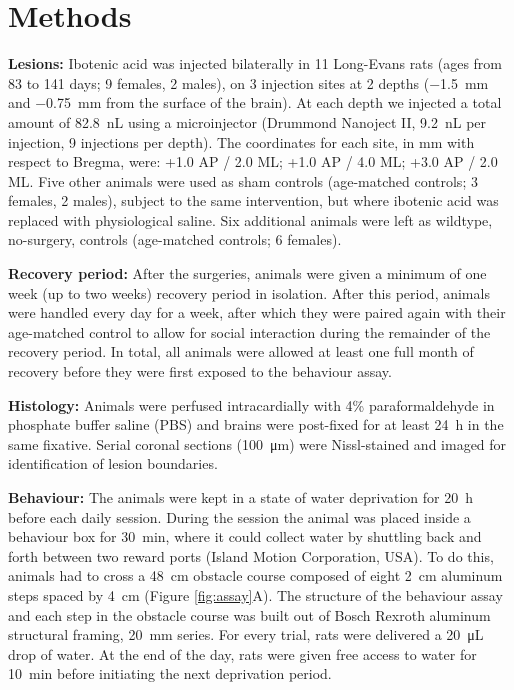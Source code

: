 \section{Methods}

\textbf{Lesions:} Ibotenic acid was injected bilaterally in 11 Long-Evans rats (ages from 83 to 141 days; 9 females, 2 males), on 3 injection sites at 2 depths (\SI{-1.5}{\milli\meter} and \SI{-0.75}{\milli\meter} from the surface of the brain). At each depth we injected a total amount of \SI{82.8}{\nano\liter} using a microinjector (Drummond Nanoject II, \SI{9.2}{\nano\liter} per injection, 9 injections per depth). The coordinates for each site, in \si{\milli\meter} with respect to Bregma, were: +1.0 AP / 2.0 ML; +1.0 AP / 4.0 ML; +3.0 AP / 2.0 ML. Five other animals were used as sham controls (age-matched controls; 3 females, 2 males), subject to the same intervention, but where ibotenic acid was replaced with physiological saline. Six additional animals were left as wildtype, no-surgery, controls (age-matched controls; 6 females).

\textbf{Recovery period:} After the surgeries, animals were given a minimum of one week (up to two weeks) recovery period in isolation. After this period, animals were handled every day for a week, after which they were paired again with their age-matched control to allow for social interaction during the remainder of the recovery period. In total, all animals were allowed at least one full month of recovery before they were first exposed to the behaviour assay.

\textbf{Histology:} Animals were perfused intracardially with 4\% paraformaldehyde in phosphate buffer saline (PBS) and brains were post-fixed for at least \SI{24}{\hour} in the same fixative. Serial coronal sections (\SI{100}{\micro\meter}) were Nissl-stained and imaged for identification of lesion boundaries.

\textbf{Behaviour:} The animals were kept in a state of water deprivation for \SI{20}{\hour} before each daily session. During the session the animal was placed inside a behaviour box for \SI{30}{\minute}, where it could collect water by shuttling back and forth between two reward ports (Island Motion Corporation, USA). To do this, animals had to cross a \SI{48}{\centi\meter} obstacle course composed of eight \SI{2}{\centi\meter} aluminum steps spaced by \SI{4}{\centi\meter} (Figure \ref{fig:assay}A). The structure of the behaviour assay and each step in the obstacle course was built out of Bosch Rexroth aluminum structural framing, \SI{20}{\milli\meter} series. For every trial, rats were delivered a \SI{20}{\micro\liter} drop of water. At the end of the day, rats were given free access to water for \SI{10}{\minute} before initiating the next deprivation period.

